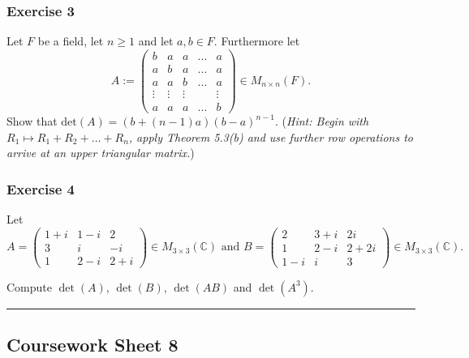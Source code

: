 \documentclass[
  12pt,
  a4paper,
  twoside]{article}
\theoremstyle{plain}
\theoremstyle{definition}
\begin{document}
\hypertarget{exercise-3-7}{%
\subsubsection*{Exercise 3}\label{exercise-3-7}}

Let \(F\) be a field, let \(n\ge 1\) and let \(a, b \in F\).
Furthermore let
\[A:= \left(\begin{array}{ccccc} b & a & a & \ldots & a \\
a & b& a & \ldots & a \\ a& a & b & \ldots & a\\ \vdots & \vdots & \vdots && \vdots \\
a& a& a& \ldots & b \end{array}\right) \in M_{n\times n}(F).\]
Show that \(\textrm{det}(A) = (b + (n-1)a)(b-a)^{n-1}\).
(\emph{Hint: Begin with \(R_1 \mapsto R_1 + R_2 + \ldots + R_n\), apply
Theorem 5.3(b) and use further row operations to arrive at an upper
triangular matrix.})

\hypertarget{exercise-4-5}{%
\subsubsection*{Exercise 4}\label{exercise-4-5}}

Let \(A = \left(\begin{array}{ccc} 1+i & 1-i & 2 \\ 3 & i & -i \\ 1 & 2-i & 2+i \end{array}\right) \in M_{3 \times 3}(\mathbb{C}) \textrm{ and } B = \left(\begin{array}{ccc} 2 & 3+i & 2i \\ 1 & 2-i & 2+2i \\ 1-i & i & 3 \end{array}\right) \in M_{3 \times 3}(\mathbb{C}).\)

Compute \(\det(A)\), \(\det(B)\), \(\det(AB)\) and \(\det(A^3)\).

\begin{center}\rule{0.5\linewidth}{0.5pt}\end{center}

\hypertarget{coursework-sheet-8}{%
\subsection{Coursework Sheet 8}\label{coursework-sheet-8}}
\end{document}
